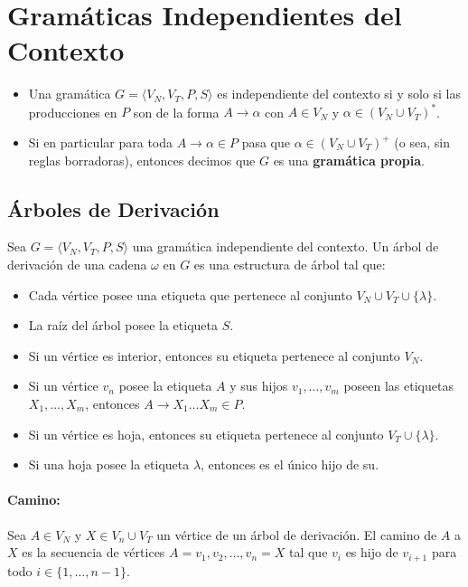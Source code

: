\section{Gramáticas Independientes del Contexto}
\begin{itemize}
  \item[] Una gramática \(G = \langle V_N, V_T, P, S \rangle\) es independiente del contexto si y solo si las producciones en \(P\) son de la forma \(A\to\alpha\) con \(A \in V_N\) y \(\alpha \in (V_N \cup V_T)^*\).
  \item[] Si en particular para toda \(A\to\alpha\in P\) pasa que \(\alpha\in(V_N\cup V_T)^+\) (o sea, sin reglas borradoras), entonces decimos que \(G\) es una \textbf{gramática propia}.
\end{itemize}

\subsection{Árboles de Derivación}
Sea \(G = \langle V_N, V_T, P, S \rangle\) una gramática independiente del contexto. Un árbol de derivación de una cadena \(\omega\) en \(G\) es una estructura de árbol tal que:
\begin{itemize}
  \item Cada vértice posee una etiqueta que pertenece al conjunto \(V_N \cup V_T\cup\{\lambda\}\).
  \item La raíz del árbol posee la etiqueta \(S\).
  \item Si un vértice es interior, entonces su etiqueta pertenece al conjunto \(V_N\).
  \item Si un vértice \(v_n\) posee la etiqueta \(A\) y sus hijos \(v_1, \ldots, v_m\) poseen las etiquetas \(X_1, \ldots, X_m\), entonces \(A\to X_1\ldots X_m\in P\).
  \item Si un vértice es hoja, entonces su etiqueta pertenece al conjunto \(V_T\cup\{\lambda\}\).
  \item Si una hoja posee la etiqueta \(\lambda\), entonces es el único hijo de su.
\end{itemize}

\paragraph{Camino:} Sea \(A\in V_N\) y \(X\in V_n\cup V_T\) un vértice de un árbol de derivación. El camino de \(A\) a \(X\) es la secuencia de vértices \(A=v_1, v_2, \ldots, v_n=X\) tal que \(v_i\) es hijo de \(v_{i+1}\) para todo \(i\in\{1, \ldots, n-1\}\).

